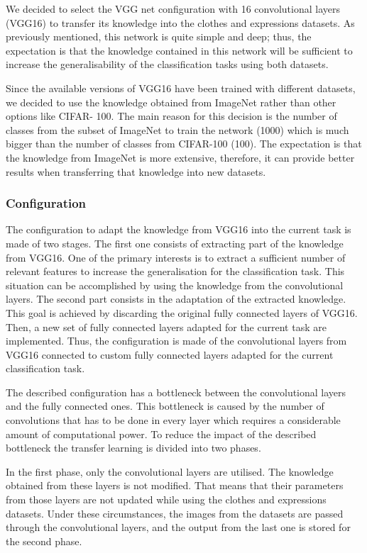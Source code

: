 \documentclass{article}
\begin{document}
We decided to select the VGG net configuration with 16 convolutional layers (VGG16) to transfer its knowledge into the clothes and expressions datasets. As previously mentioned, this network is quite simple and deep; thus, the expectation is that the knowledge contained in this network will be sufficient to increase the generalisability of the classification tasks using both datasets.

Since the available versions of VGG16 have been trained with different datasets, we decided to use the knowledge obtained from ImageNet rather than other options like CIFAR- 100. The main reason for this decision is the number of classes from the subset of ImageNet to train the network (1000) which is much bigger than the number of classes from CIFAR-100 (100). The expectation is that the knowledge from ImageNet is more extensive, therefore, it can provide better results when transferring that knowledge into new datasets.

\subsubsection{\textbf{Configuration}}

The configuration to adapt the knowledge from VGG16 into the current task is made of two stages. The first one consists of extracting part of the knowledge from VGG16. One of the primary interests is to extract a sufficient number of relevant features to increase the generalisation for the classification task. This situation can be accomplished by using the knowledge from the convolutional layers. The second part consists in the adaptation of the extracted knowledge. This goal is achieved by discarding the original fully connected layers of VGG16. Then, a new set of fully connected layers adapted for the current task are implemented. Thus, the configuration is made of the convolutional layers from VGG16 connected to custom fully connected layers adapted for the current classification task.

The described configuration has a bottleneck between the convolutional layers and the fully connected ones. This bottleneck is caused by the number of convolutions that has to be done in every layer which requires a considerable amount of computational power. To reduce the impact of the described bottleneck the transfer learning is divided into two phases.

In the first phase, only the convolutional layers are utilised. The knowledge obtained from these layers is not modified. That means that their parameters from those layers are not updated while using the clothes and expressions datasets. Under these circumstances, the images from the datasets are passed through the convolutional layers, and the output from the last one is stored for the second phase.
\end{document}
